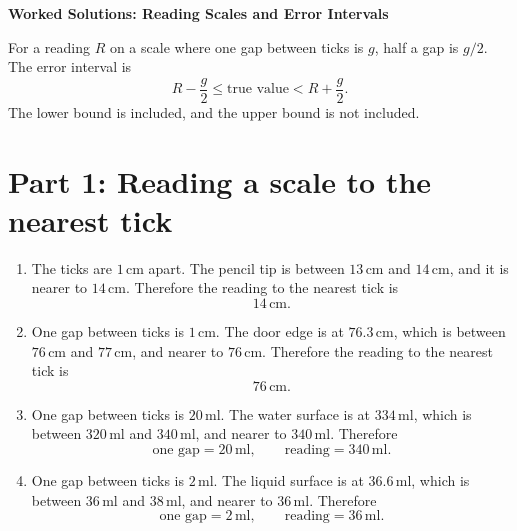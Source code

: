 \documentclass[11pt,a4paper]{article}
\begin{document}
\begin{center}
  {\Large\bfseries Worked Solutions: Reading Scales and Error Intervals}
\end{center}

\noindent
For a reading \(R\) on a scale where one gap between ticks is \(g\), half a gap is \(g/2\). The error interval is
\[
R-\frac{g}{2}\le \text{true value}<R+\frac{g}{2}.
\]
The lower bound is included, and the upper bound is not included.

\section*{Part 1: Reading a scale to the nearest tick}

\begin{enumerate}[label=\textbf{Q\arabic*.}, leftmargin=*, itemsep=8pt]

\item 
\begin{solbox}
The ticks are \(1\,\text{cm}\) apart. The pencil tip is between \(13\,\text{cm}\) and \(14\,\text{cm}\), and it is nearer to \(14\,\text{cm}\). Therefore the reading to the nearest tick is
\[
\boxed{14\,\text{cm}}.
\]
\end{solbox}

\item 
\begin{solbox}
One gap between ticks is \(1\,\text{cm}\). The door edge is at \(76.3\,\text{cm}\), which is between \(76\,\text{cm}\) and \(77\,\text{cm}\), and nearer to \(76\,\text{cm}\). Therefore the reading to the nearest tick is
\[
\boxed{76\,\text{cm}}.
\]
\end{solbox}

\item 
\begin{solbox}
One gap between ticks is \(20\,\text{ml}\). The water surface is at \(334\,\text{ml}\), which is between \(320\,\text{ml}\) and \(340\,\text{ml}\), and nearer to \(340\,\text{ml}\). Therefore
\[
\boxed{\text{one gap}=20\,\text{ml}},\qquad \boxed{\text{reading}=340\,\text{ml}}.
\]
\end{solbox}

\item 
\begin{solbox}
One gap between ticks is \(2\,\text{ml}\). The liquid surface is at \(36.6\,\text{ml}\), which is between \(36\,\text{ml}\) and \(38\,\text{ml}\), and nearer to \(36\,\text{ml}\). Therefore
\[
\boxed{\text{one gap}=2\,\text{ml}},\qquad \boxed{\text{reading}=36\,\text{ml}}.
\]
\end{solbox}


\end{enumerate}
\end{document}
